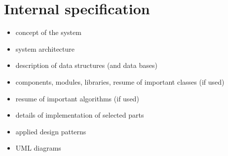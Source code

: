 \documentclass[a4paper,twoside,12pt]{book}
\begin{document}
%
%
%
%
%


\chapter{Internal specification}

\begin{itemize}
\item concept of the system
\item system architecture
\item description of data structures (and data bases)
\item components, modules, libraries, resume of important classes (if used)
\item resume of important algorithms (if used)
\item details of implementation of selected parts
\item applied design patterns
\item UML diagrams
\end{itemize}
\end{document}
